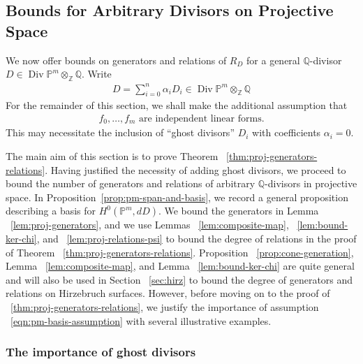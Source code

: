 \documentclass{amsart}
\theoremstyle{plain}
\theoremstyle{definition}
\theoremstyle{remark}
\numberwithin{equation}{section}
\newcommand\ssec{\subsection}
\newcommand\sssec{\subsubsection}
\newcommand\bq{{\mathbb Q}}
\newcommand\bp{{\mathbb P}}
\newcommand\bz{{\mathbb Z}}
\DeclareMathOperator\di{Div}
\begin{document}
\ssec{Bounds for Arbitrary Divisors on Projective Space}
\label{ssec:arbitrary-projective}
We now offer bounds on generators and relations of $R_D$ for a general $\bq$-divisor $D \in \di \bp^m \otimes_\bz \bq$.
Write \begin{align*}
	D = \sum_{i=0}^{n}\alpha_i D_i \in \di \bp^m \otimes_\bz \bq
\end{align*}
For the remainder of this section, we shall make the additional assumption that 
\begin{align} \label{eqn:pm-basis-assumption} f_0, \ldots, f_{m}
	\text{ are independent linear forms.} \end{align}
This may necessitate the inclusion of ``ghost divisors'' $D_i$ with coefficients $\alpha_i = 0$. 

The main aim of this section is to prove Theorem
~\ref{thm:proj-generators-relations}.
Having justified the necessity of adding ghost divisors, we proceed to bound the
number of generators and relations of arbitrary $\bq$-divisors in 
projective space. 
In Proposition~\ref{prop:pm-span-and-basis}, we record a general proposition describing
a basis for $H^0(\bp^m, dD)$.
We bound the generators in Lemma ~\ref{lem:proj-generators}, and we use Lemmas ~\ref{lem:composite-map}, ~\ref{lem:bound-ker-chi}, and ~\ref{lem:proj-relations-psi} to bound the 
degree of relations in the proof of Theorem ~\ref{thm:proj-generators-relations}. Proposition ~\ref{prop:cone-generation}, Lemma ~\ref{lem:composite-map}, and Lemma ~\ref{lem:bound-ker-chi} are quite 
general and will also be used in Section ~\ref{sec:hirz} to bound the 
degree of generators and relations on Hirzebruch surfaces.
However, before moving on to the proof of ~\ref{thm:proj-generators-relations}, we justify the importance of assumption
~\eqref{eqn:pm-basis-assumption} with several illustrative examples.

\sssec*{The importance of ghost divisors}
\label{sssec:ghost-divisors}
\end{document}
